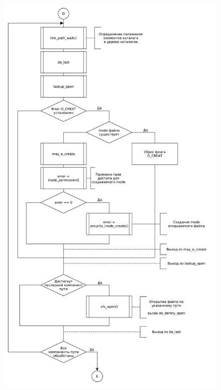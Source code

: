 \begin{figure}[H]
    \centering
    \caption{}
    \includegraphics[scale=0.5]{pdf/flowchart05.pdf}
\end{figure}
